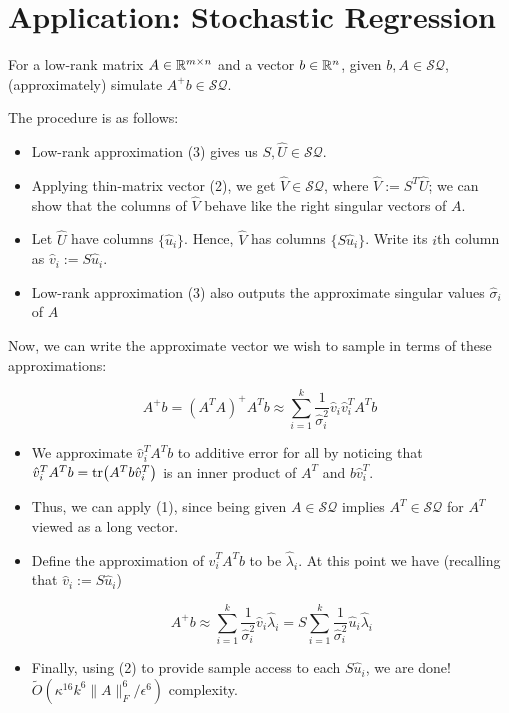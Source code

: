 \documentclass[main.tex]{subfiles}
\begin{document}
\section{Application: Stochastic Regression}

For a low-rank matrix $A \in \mathbb{R}^{m\times n}$
  and a vector $b \in \mathbb{R}^n$, given $b, A \in \mathcal{SQ}$, (approximately) simulate $A^+b \in \mathcal{SQ}$.

\begin{algorithm}   	
The procedure is as follows:
\begin{itemize}
\item Low-rank approximation (3) gives us $S,\hat{U} \in \mathcal{SQ}$.

\item Applying thin-matrix vector (2), we get $\hat{V} \in \mathcal{SQ}$, where $\hat{V} := S^T\hat{U}$; we can show that the columns of $\hat{V}$ behave like the right singular vectors of $A$.
\item Let $\hat{U}$ have columns $\{ \hat{u}_i\}$. Hence, $\hat{V}$ has columns $\{ S \hat{u}_i \}$. Write its $i$th column as $\hat{v}_i := S\hat{u}_i$.

\item Low-rank approximation (3) also outputs the approximate singular values $\hat{\sigma}_i$ of $A$
\end{itemize}
\end{algorithm}

Now, we can write the approximate vector we wish to sample in terms of these approximations:

$$A^+b = (A^TA)^+A^Tb \approx \sum_{i=1}^k \frac{1}{\hat{\sigma}_i^2}\hat{v}_i\hat{v}_i^T A^Tb$$

\begin{itemize}
\item We approximate $\hat{v}_i^TA^Tb$ to additive error for all by noticing that $\hat{v}_i^TA^Tb = \tr(A^Tb\hat{v}_i^T)$ is an inner product of $A^T$ and $b\hat{v}_i^T$. 
\item Thus, we can apply (1), since being given $A \in \mathcal{SQ}$ implies $A^T \in \mathcal{SQ}$ for $A^T$ viewed as a long vector. 
\item Define the approximation of $\hat{v}_i^TA^Tb$ to be $\hat{\lambda}_i$. At this point we have (recalling that $\hat{v}_i := S\hat{u}_i$)

$$A^+b \approx \sum_{i=1}^k \frac{1}{\hat{\sigma}_i^2}\hat{v}_i\hat{\lambda}_i = S \sum_{i=1}^k \frac{1}{\hat{\sigma}_i^2}\hat{u}_i\hat{\lambda}_i$$

\item Finally, using (2) to provide sample access to each $S \hat{u}_i$, we are done! $\tilde{O}(\kappa^{16}k^6 \|A\|^6_F / \epsilon^6)$ complexity.
\end{itemize}
\end{document}
